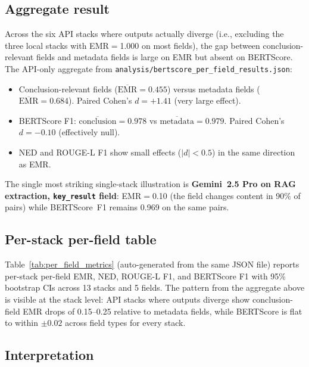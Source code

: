 \documentclass[11pt]{article}
\begin{document}
\subsection{Aggregate result}

Across the six API stacks where outputs actually diverge (i.e., excluding the three local stacks with EMR${=}$1.000 on most fields), the gap between conclusion-relevant fields and metadata fields is large on EMR but absent on BERTScore. The API-only aggregate from \texttt{analysis/bertscore\_per\_field\_results.json}:

\begin{itemize}[leftmargin=*]
  \item Conclusion-relevant fields ($\overline{\text{EMR}}{=}0.455$) versus metadata fields ($\overline{\text{EMR}}{=}0.684$). Paired Cohen's $d{=}+1.41$ (very large effect).
  \item BERTScore F1: $\overline{\text{conclusion}}{=}0.978$ vs $\overline{\text{metadata}}{=}0.979$. Paired Cohen's $d{=}-0.10$ (effectively null).
  \item NED and ROUGE-L F1 show small effects ($|d|{<}0.5$) in the same direction as EMR.
\end{itemize}

\noindent The single most striking single-stack illustration is \textbf{Gemini~2.5 Pro on RAG extraction, \texttt{key\_result} field}: EMR${=}$0.10 (the field changes content in 90\% of pairs) while BERTScore~F1 remains 0.969 on the same pairs.

\subsection{Per-stack per-field table}

Table~\ref{tab:per_field_metrics} (auto-generated from the same JSON file) reports per-stack per-field EMR, NED, ROUGE-L F1, and BERTScore F1 with 95\% bootstrap CIs across 13 stacks and 5 fields. The pattern from the aggregate above is visible at the stack level: API stacks where outputs diverge show conclusion-field EMR drops of 0.15--0.25 relative to metadata fields, while BERTScore is flat to within $\pm 0.02$ across field types for every stack.

\subsection{Interpretation}
\end{document}
